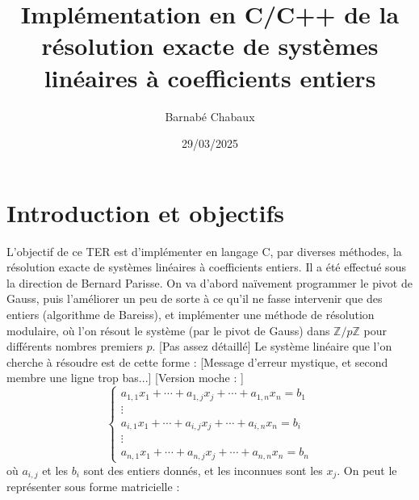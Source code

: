 \documentclass[french]{article}
\title{Implémentation en C/C++ de la résolution exacte de systèmes linéaires à coefficients entiers}
\date{29/03/2025}
\author{Barnabé Chabaux}
\begin{document}
\maketitle
\section{Introduction et objectifs}
L'objectif de ce TER est d'implémenter en langage C, par diverses méthodes, la résolution exacte de systèmes linéaires à coefficients entiers. Il a été effectué sous la direction de Bernard Parisse.
\newline
On va d'abord naïvement programmer le pivot de Gauss, puis l'améliorer un peu de sorte à ce qu'il ne fasse intervenir que des entiers (algorithme de Bareiss), et implémenter une méthode de résolution modulaire, où l'on résout le système (par le pivot de Gauss) dans $\mathbb{Z}/p\mathbb{Z}$ pour différents nombres premiers $p$. [Pas assez détaillé]
\newline
Le système linéaire que l'on cherche à résoudre est de cette forme :
\newline
[Message d'erreur mystique, et second membre une ligne trop bas...] [Version moche : ]
\begin{equation*}
	\begin{cases}
		a_{1,1} x_1 + \cdots + a_{1,j} x_j + \cdots + a_{1,n} x_n = b_1\\
		\vdots\\
		a_{i,1} x_1 + \cdots + a_{i,j} x_j + \cdots + a_{i,n} x_n = b_i\\
		\vdots\\
		a_{n,1} x_1 + \cdots + a_{n,j} x_j + \cdots + a_{n,n} x_n = b_n
	\end{cases}
\end{equation*}
où $a_{i,j}$ et les $b_i$ sont des entiers donnés, et les inconnues sont les $x_j$.
\newline
On peut le représenter sous forme matricielle :
\end{document}
